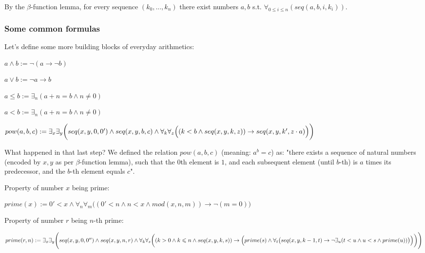 \documentclass{article}
\begin{document}
By the $\beta$-function lemma, for every sequence $(k_0, ..., k_n)$ there exist numbers $a, b$ s.t.
$\forall_{0 \leqslant i \leqslant n}(seq(a, b, i, k_i))$.

\subsubsection{Some common formulas}

Let's define some more building blocks of everyday arithmetics:

\begin{center}
    $a \land b := \neg(a \rightarrow \neg b)$

    $a \lor b := \neg a \rightarrow b$
    
    $a \leqslant b := \exists_n (a + n = b \land n \neq 0)$
    
    $a < b := \exists_n (a + n = b \land n \neq 0)$

    $ pow(a, b, c) := \exists_x \exists_y \biggl(
        seq(x, y, 0, 0') \land seq(x, y, b, c) \land
        \forall_k \forall_z \Bigl(
            (k < b \land seq(x, y, k, z))
            \rightarrow
            seq(x, y, k', z \cdot a)
        \Bigl)
    \biggl) $
\end{center}

What happened in that last step? We defined the relation $pow(a, b, c)$ (meaning: $a^b = c$)
as: "there exists a sequence of natural numbers (encoded by $x, y$ as per $\beta$-function
lemma), such that the $0$th element is $1$, and each subsequent element (until $b$-th) is
$a$ times its predecessor, and the $b$-th element equals $c$".

Property of number $x$ being prime:

\begin{center}
    $prime(x) := 0' < x \land \forall_n \forall_m \bigl(
        (0' < n \land n < x \land mod(x, n, m)) \rightarrow \neg (m = 0)
    \bigl)$
\end{center}

Property of number $r$ being $n$-th prime:

\begin{center}
    $prime(r, n) := \exists_x \exists_y \Biggl(
        seq(x, y, 0, 0'') \land seq(x, y, n, r) \land
        \forall_k \forall_s \biggl(
            (k > 0 \land k \leqslant n \land seq(x, y, k, s))
            \rightarrow
            \Bigl(
                prime(s) \land \forall_t \bigl(
                    seq(x, y, k-1, t)
                    \rightarrow
                    \neg \exists_u (t < u \land u < s \land prime(u))
                \bigl)
            \Bigl)
        \biggl)
    \Biggl)$
\end{center}
\end{document}

